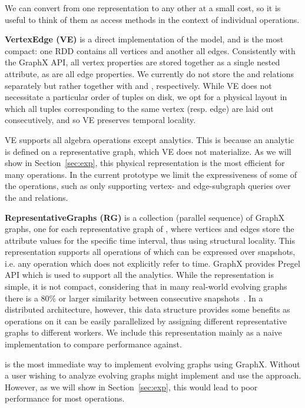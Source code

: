 We can convert from one representation to any other at a small cost,
so it is useful to think of them as access methods in the context of
individual operations.

{\bf VertexEdge (VE)} is a direct implementation of the \tve model,
and is the most compact: one RDD contains all vertices and another all
edges.  Consistently with the GraphX API, all vertex properties are
stored together as a single nested attribute, as are all edge
properties.  We currently do not store the \tv and \te relations
separately but rather together with \tav and \tae, respectively.
While VE does not necessitate a particular order of tuples on disk, we
opt for a physical layout in which all tuples corresponding to the
same vertex (resp. edge) are laid out consecutively, and so VE
preserves temporal locality.


VE supports all \tg algebra operations except analytics.  This is
because an analytic is defined on a representative graph, which VE
does not materialize.  As we will show in Section~\ref{sec:exp}, this
physical representation is the most efficient for many operations.  In
the current prototype we limit the expressiveness of some of the
operations, such as only supporting vertex- and edge-subgraph queries
over the \tav and \tae relations.

{\bf RepresentativeGraphs (RG)} is a collection (parallel sequence) of
GraphX graphs, one for each representative graph of \ttt, where
vertices and edges store the attribute values for the specific time
interval, thus using structural locality.  This representation
supports all operations of \tga which can be expressed over snapshots,
i.e. any operation which does not explicitly refer to time.  GraphX
provides Pregel API which is used to support all the analytics.
%
While the \rg representation is simple, it is not compact, considering
that in many real-world evolving graphs there is a 80\% or larger
similarity between consecutive snapshots~\cite{Miao2015}.  In a
distributed architecture, however, this data structure provides some
benefits as operations on it can be easily parallelized by assigning
different representative graphs to different workers.  We include this
representation mainly as a naive implementation to compare performance
against.

\rg is the most immediate way to implement evolving graphs using
GraphX. Without \ql a user wishing to analyze evolving graphs might
implement and use the \rg approach.  However, as we will show in
Section~\ref{sec:exp}, this would lead to poor performance for most
operations.

